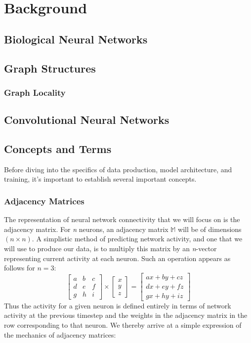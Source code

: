 
\chapter{Background}

\section{Biological Neural Networks}

\section{Graph Structures}

\subsection{Graph Locality}

\section{Convolutional Neural Networks}


\section{Concepts and Terms}
Before diving into the specifics of data production, model architecture, and 
training, it's important to establish several important concepts.

\subsection{Adjacency Matrices}
\label{subsec:adjacency}
The representation of neural network connectivity that we will focus on is the 
adjacency matrix. For \textit{n} neurons, an adjacency matrix $\mathbb{M}$ will 
be of dimensions $(n \times n)$. A simplistic method of predicting network 
activity, and one that we will use to produce our data, is to multiply this 
matrix by an \textit{n}-vector representing current activity at each neuron.  
Such an operation appears as follows for $n=3$:
\[ \begin{bmatrix}
		a & b & c\\
		d & e & f\\
		g & h & i
	\end{bmatrix}
	\times
	\begin{bmatrix}
		x\\
		y\\
		z
	\end{bmatrix}
	=
	\begin{bmatrix}
		ax + by + cz\\
		dx + ey + fz\\
		gx + hy + iz
	\end{bmatrix}
\]
Thus the activity for a given neuron is defined entirely in terms of network 
activity at the previous timestep and the weights in the adjacency matrix in the 
row corresponding to that neuron. We thereby arrive at a simple expression of 
the mechanics of adjacency matrices: 

